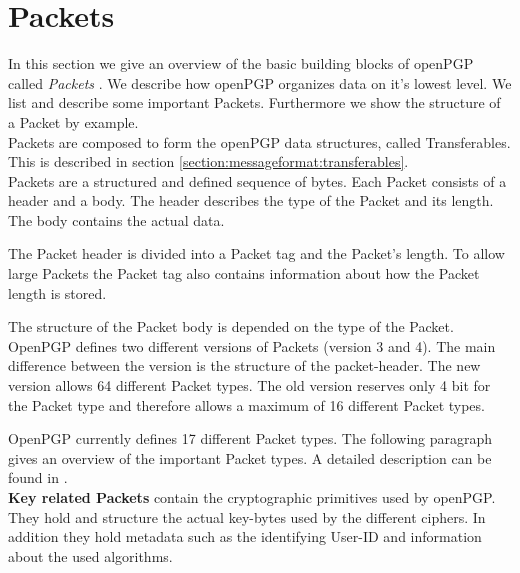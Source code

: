 \section{Packets}
\label{section:messageformat:packets}

In this section we give an overview of the basic building blocks of openPGP called \textit{Packets} \cite[section 5]{RFC4880}. We describe how openPGP organizes data on it's lowest level. We list and describe some important Packets. Furthermore we show the structure of a Packet by example.  \\

Packets are composed to form the openPGP data structures, called Transferables. This is described in section \ref{section:messageformat:transferables}. \\

Packets are a structured and defined sequence of bytes.  Each Packet consists of a header and a body. The header describes the type of the Packet and its length. The body contains the actual data.

The Packet header is divided into a Packet tag and the Packet's length. To allow large Packets the Packet tag also contains information about how the Packet length is stored. 

The structure of the Packet body is depended on the type of the Packet. \\


OpenPGP defines two different versions of Packets (version 3 and 4). The main difference between the version is the structure of the packet-header. The new version allows 64 different Packet types. The old version reserves only 4 bit for the Packet type and therefore allows a maximum of 16 different Packet types.

OpenPGP currently defines 17 different Packet types. The following paragraph gives an overview of the important Packet types. A detailed description can be found in \cite[section 5]{RFC4880}. \\ 


\textbf{Key related Packets} contain the cryptographic primitives used by openPGP. They hold and structure the actual key-bytes used by the different ciphers. In addition they hold metadata such as the identifying User-ID and information about the used algorithms.

